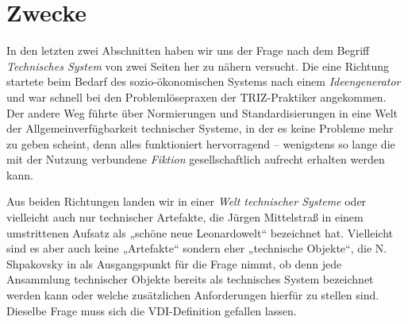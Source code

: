 \documentclass[11pt,a4paper]{article}
\begin{document}
\section{Zwecke}

In den letzten zwei Abschnitten haben wir uns der Frage nach dem Begriff
\emph{Technisches System} von zwei Seiten her zu nähern versucht. Die eine
Richtung startete beim Bedarf des sozio-ökonomischen Systems nach einem
\emph{Ideengenerator} und war schnell bei den Problemlösepraxen der
TRIZ-Praktiker angekommen. Der andere Weg führte über Normierungen und
Standardisierungen in eine Welt der Allgemeinverfügbarkeit technischer
Systeme, in der es keine Probleme mehr zu geben scheint, denn alles
funktioniert hervorragend -- wenigstens so lange die mit der Nutzung
verbundene \emph{Fiktion} gesellschaftlich aufrecht erhalten werden kann.

Aus beiden Richtungen landen wir in einer \emph{Welt technischer Systeme} oder
vielleicht auch nur technischer Artefakte, die Jürgen Mittelstraß in einem
umstrittenen Aufsatz \cite{Mittelstrass2011} als „schöne neue Leonardowelt“
bezeichnet hat.  Vielleicht sind es aber auch keine „Artefakte“ sondern eher
„technische Objekte“, die N. Shpakovsky in \cite{Shpakovsky2003} als
Ausgangspunkt für die Frage nimmt, ob denn jede Ansammlung technischer Objekte
bereits als technisches System bezeichnet werden kann oder welche zusätzlichen
Anforderungen hierfür zu stellen sind.  Dieselbe Frage muss sich die
VDI-Definition gefallen lassen.
\end{document}
